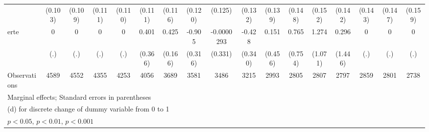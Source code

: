{\begin{tabular}{l*{16}{c}}
                    &     (0.103)         &     (0.109)         &     (0.111)         &     (0.110)         &     (0.111)         &     (0.116)         &     (0.120)         &     (0.125)         &     (0.132)         &     (0.139)         &     (0.148)         &     (0.152)         &     (0.142)         &     (0.143)         &     (0.147)         &     (0.159)         \\
[1em]
erte                &           0         &           0         &           0         &           0         &       0.401         &       0.425\sym{*}  &      -0.905\sym{**} &  -0.0000293         &      -0.428         &       0.151         &       0.765         &       1.274         &       0.296         &           0         &           0         &           0         \\
                    &         (.)         &         (.)         &         (.)         &         (.)         &     (0.366)         &     (0.166)         &     (0.316)         &     (0.331)         &     (0.340)         &     (0.456)         &     (0.754)         &     (1.071)         &     (1.446)         &         (.)         &         (.)         &         (.)         \\
\hline
Observations        &        4589         &        4552         &        4355         &        4253         &        4056         &        3689         &        3581         &        3486         &        3215         &        2993         &        2805         &        2807         &        2797         &        2859         &        2801         &        2738         \\
\hline\hline
\multicolumn{17}{l}{\footnotesize Marginal effects; Standard errors in parentheses}\\
\multicolumn{17}{l}{\footnotesize  (d) for discrete change of dummy variable from 0 to 1}\\
\multicolumn{17}{l}{\footnotesize \sym{*} \(p<0.05\), \sym{**} \(p<0.01\), \sym{***} \(p<0.001\)}\\
\end{tabular}
}
